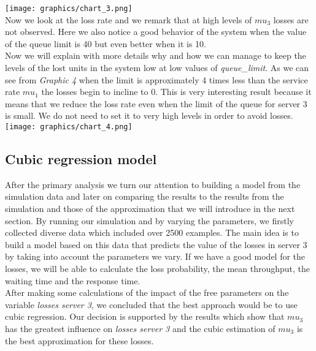 \documentclass[12pt]{article}
\theoremstyle{plain}
\begin{document}
\texttt{[image: graphics/chart\_3.png]}\\

Now we look at the loss rate and we remark that at high levels of $mu_3$ losses are
not observed. Here we also notice a good behavior of the system when the value
of the queue limit is 40 but even better when it is 10.\\
Now we will explain with more details why and how we can manage to keep the
levels of the lost units in the system low at low values of \emph{queue\_limit}.
As we can see from \emph{Graphic 4} when the limit is approximately 4 times less
than the service rate $mu_1$ the losses begin to incline to 0. This is very
interesting result because it means that we reduce the loss rate even when the
limit of the queue for server 3 is small. We do not need to set it to very high
levels in order to avoid losses.\\

\texttt{[image: graphics/chart\_4.png]}\\

\subsection*{\textbf{Cubic regression model}
}

After the primary analysis we turn our attention to building a model from the
simulation data and later on comparing the results to the results from the
simulation and those of the approximation that we will introduce in the next
section. By running our simulation and by varying the parameters, we firstly collected
diverse data which included over 2500 examples. The main idea is to build a model
based on this data that predicts the value of the losses in server 3 by taking
into account the parameters we vary. If we have a good model for the losses, we
will be able to calculate the loss probability, the mean throughput, the waiting
time and the response time.\\
After making some calculations of the impact of the free parameters on the variable
\emph{losses server 3}, we concluded that the best approach would be to use cubic
regression. Our decision is supported by the results which show that $mu_3$ has
the greatest influence on \emph{losses server 3} and the cubic estimation of $mu_3$
is the best approximation for these losses.\\
\end{document}
